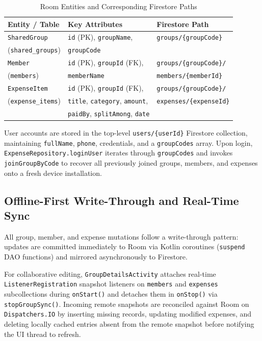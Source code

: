 \documentclass[sigconf,nonacm]{acmart}
\begin{document}
\begin{table}[h]
  \caption{Room Entities and Corresponding Firestore Paths}
  \label{tab:schema}
  \small
  \begin{tabular}{@{}lll@{}}
    \toprule
    \textbf{Entity / Table} & \textbf{Key Attributes} & \textbf{Firestore Path} \\
    \midrule
    \texttt{SharedGroup} & \texttt{id} (PK), \texttt{groupName}, & \texttt{groups/\{groupCode\}} \\
    (\texttt{shared\_groups}) & \texttt{groupCode} & \\
    \addlinespace
    \texttt{Member} & \texttt{id} (PK), \texttt{groupId} (FK), & \texttt{groups/\{groupCode\}/} \\
    (\texttt{members}) & \texttt{memberName} & \texttt{members/\{memberId\}} \\
    \addlinespace
    \texttt{ExpenseItem} & \texttt{id} (PK), \texttt{groupId} (FK), & \texttt{groups/\{groupCode\}/} \\
    (\texttt{expense\_items}) & \texttt{title}, \texttt{category}, \texttt{amount}, & \texttt{expenses/\{expenseId\}} \\
     & \texttt{paidBy}, \texttt{splitAmong}, \texttt{date} & \\
    \bottomrule
  \end{tabular}
\end{table}

User accounts are stored in the top-level \texttt{users/\{userId\}} Firestore collection, maintaining \texttt{fullName}, \texttt{phone}, credentials, and a \texttt{groupCodes} array. Upon login, \texttt{ExpenseRepository.loginUser} iterates through \texttt{groupCodes} and invokes \texttt{joinGroupByCode} to recover all previously joined groups, members, and expenses onto a fresh device installation.

\subsection{Offline-First Write-Through and Real-Time Sync}
All group, member, and expense mutations follow a write-through pattern: updates are committed immediately to Room via Kotlin coroutines (\texttt{suspend} DAO functions) and mirrored asynchronously to Firestore.

For collaborative editing, \texttt{GroupDetailsActivity} attaches real-time \texttt{ListenerRegistration} snapshot listeners on \texttt{members} and \texttt{expenses} subcollections during \texttt{onStart()} and detaches them in \texttt{onStop()} via \texttt{stopGroupSync()}. Incoming remote snapshots are reconciled against Room on \texttt{Dispatchers.IO} by inserting missing records, updating modified expenses, and deleting locally cached entries absent from the remote snapshot before notifying the UI thread to refresh.
\end{document}
